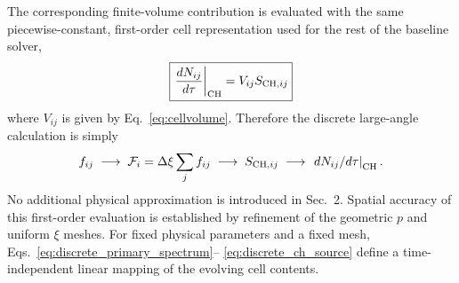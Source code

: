 \documentclass[11pt]{article}
\begin{document}
The corresponding finite-volume contribution is evaluated with the same
piecewise-constant, first-order cell representation used for the rest of the baseline
solver,
\begin{equation}
 \boxed{
 \left.\frac{dN_{ij}}{d\tau}\right|_{\rm CH}
 =V_{ij}S_{{\rm CH},ij}
 }
 \label{eq:discrete_ch_source}
\end{equation}
where $V_{ij}$ is given by Eq.~\eqref{eq:cellvolume}.  Therefore the discrete
large-angle calculation is simply
\begin{equation}
 f_{ij}
 \;\longrightarrow\;
 \mathcal F_i=\Delta\xi\sum_j f_{ij}
 \;\longrightarrow\;
 S_{{\rm CH},ij}
 \;\longrightarrow\;
 \left.dN_{ij}/d\tau\right|_{\rm CH}.
\end{equation}
No additional physical approximation is introduced in Sec.~2.  Spatial accuracy of this
first-order evaluation is established by refinement of the geometric $p$ and uniform
$\xi$ meshes.
For fixed physical parameters and a fixed mesh, Eqs.~\eqref{eq:discrete_primary_spectrum}--
\eqref{eq:discrete_ch_source} define a time-independent linear mapping of the evolving
cell contents.
\end{document}
